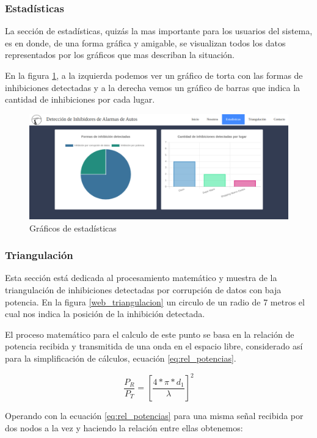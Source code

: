 \subsubsection{Estadísticas}
La sección de estadísticas, quizás la mas importante para los usuarios del sistema, es en donde, de una forma gráfica y amigable, se visualizan todos los 
datos representados por los gráficos que mas describan la situación. 
\par En la figura \ref{web_est}, a la izquierda podemos ver un gráfico de torta con las formas de inhibiciones detectadas y a la derecha vemos un gráfico 
de barras que indica la cantidad de inhibiciones por cada lugar. 
\begin{figure}[h!]
	\centering
	\includegraphics[scale=0.3]{images/web/est-web.png}
    \caption{Gráficos de estadísticas}
	\label{web_est}
\end{figure}
\subsubsection{Triangulación}
\par Esta sección está dedicada al procesamiento matemático y muestra de la triangulación de inhibiciones detectadas por corrupción de
 datos con baja potencia. En la figura \ref{web_triangulacion} un circulo de un radio de 7 metros el cual nos indica la posición de la inhibición detectada.
\par El proceso matemático para el calculo de este punto se basa en la relación de potencia recibida y transmitida de una onda en el espacio libre, considerado 
así para la simplificación de cálculos,  ecuación \ref{eq:rel_potencias}.
 
 \begin{equation}\label{eq:rel_potencias}
    \frac{P_R}{P_T} = \left[\frac{4*\pi*d_1}{\lambda}\right]^{2}
\end{equation}

Operando con la ecuación \ref{eq:rel_potencias} para una misma señal recibida por dos nodos a la vez y haciendo la relación entre ellas obtenemos:

